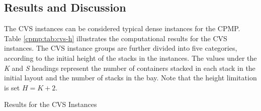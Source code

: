 \documentclass{article}
\begin{document}
\subsection{Results and Discussion}

The CVS instances can be considered typical dense instances for the CPMP\@. Table \ref{cpmp:tab:cvs-h} illustrates the computational results for the CVS instances. The CVS instance groups are further divided into five categories, according to the initial height of the stacks in the instances.
The values under the \textit{K} and \textit{S} headings represent the number of containers stacked in each stack in the initial layout and the number of stacks in the bay. Note that the height limitation is set $H=K+2$.

\begin{table}[htbp]
\centering\footnotesize
\caption{Results for the CVS Instances}
\label{cpmp:tab:cvs-h}


\end{table}
\end{document}
